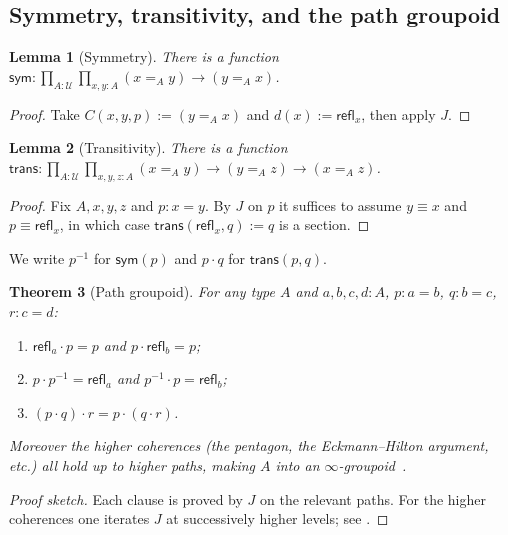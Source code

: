 \documentclass[12pt]{article}
\newtheorem{theorem}{Theorem}[section]
\newtheorem{lemma}[theorem]{Lemma}
\theoremstyle{definition}
\theoremstyle{remark}
\newcommand{\U}{\mathcal{U}}
\newcommand{\refl}{\mathsf{refl}}
\begin{document}
\subsection{Symmetry, transitivity, and the path groupoid}

\begin{lemma}[Symmetry]
\label{lem:sym}
There is a function
$\mathsf{sym} : \prod_{A : \U}\prod_{x, y : A} (x =_A y) \to (y =_A x)$.
\end{lemma}

\begin{proof}
Take $C(x, y, p) := (y =_A x)$ and $d(x) := \refl_x$, then apply $J$.
\end{proof}

\begin{lemma}[Transitivity]
\label{lem:trans}
There is a function $\mathsf{trans} : \prod_{A : \U}\prod_{x, y, z : A}
(x =_A y) \to (y =_A z) \to (x =_A z)$.
\end{lemma}

\begin{proof}
Fix $A, x, y, z$ and $p : x = y$. By $J$ on $p$ it suffices to assume
$y \equiv x$ and $p \equiv \refl_x$, in which case
$\mathsf{trans}(\refl_x, q) := q$ is a section.
\end{proof}

We write $p^{-1}$ for $\mathsf{sym}(p)$ and $p \cdot q$ for
$\mathsf{trans}(p, q)$.

\begin{theorem}[Path groupoid]
\label{thm:groupoid}
For any type $A$ and $a, b, c, d : A$, $p : a = b$, $q : b = c$, $r : c = d$:
\begin{enumerate}
\item $\refl_a \cdot p = p$ and $p \cdot \refl_b = p$;
\item $p \cdot p^{-1} = \refl_a$ and $p^{-1} \cdot p = \refl_b$;
\item $(p \cdot q) \cdot r = p \cdot (q \cdot r)$.
\end{enumerate}
Moreover the higher coherences (the pentagon, the Eckmann--Hilton
argument, etc.) all hold up to higher paths, making $A$ into an
$\infty$-groupoid~\cite{LumsdaineGroupoid, vandenBergGarner}.
\end{theorem}

\begin{proof}[Proof sketch]
Each clause is proved by $J$ on the relevant paths. For the higher coherences
one iterates $J$ at successively higher levels; see
\cite[\S2.1]{HoTTBook}.
\end{proof}
\end{document}
